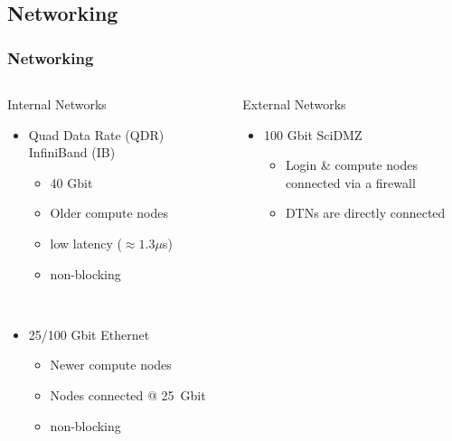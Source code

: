 \subsection{Networking}
\begin{frame}
  \frametitle{Networking}
	\begin{columns}
	\begin{column}{0.46\textwidth}
		\begin{block}{Internal Networks}
		\begin{itemize}
			\item Quad Data Rate (QDR)\\InfiniBand{\regtrademark} (IB)   
				\begin{itemize}
					\item 40 Gbit
					\item Older compute nodes
					\item low latency ($\approx1.3\mu$s)
					\item non-blocking
				\end{itemize}
				~\\
			\item 25/100 Gbit Ethernet
				\begin{itemize}
					\item Newer compute nodes
					\item Nodes connected @ 25~Gbit
					\item non-blocking
				\end{itemize}
	        \end{itemize}
                \end{block}
	\end{column}
	\begin{column}{0.46\textwidth}
		\begin{block}{External Networks}
		\begin{itemize}
			\item 100 Gbit SciDMZ
				\begin{itemize}
					\item Login \& compute nodes\\connected via a firewall
					\item DTNs are directly connected
				\end{itemize}
		\end{itemize}
                \end{block}
	\end{column}
	\end{columns}
\end{frame}



